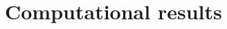 \documentclass[3p,11pt,authoryear]{elsarticle}  %
\begin{document}

    \section{Computational results} \label{sec:Computational Results}
\end{document}
